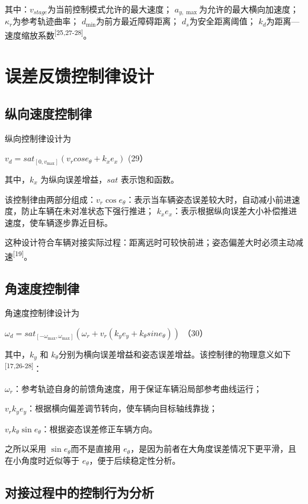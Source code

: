 其中：\(v_{stage}\)为当前控制模式允许的最大速度；
\(a_{y,\max}\)为允许的最大横向加速度； \(\kappa_{r}\)为参考轨迹曲率；
\(d_{\min}\)为前方最近障碍距离； \(d_{s}\)为安全距离阈值；
\(k_{d}\)为距离---速度缩放系数\textsuperscript{[25,27-28]}。

\section{误差反馈控制律设计}

\subsection{纵向速度控制律}

纵向控制律设计为

\(v_{d} = {sat}_{\left\lbrack 0,v_{\max} \right\rbrack}\left( v_{r}cose_{\theta} + k_{x}e_{x} \right)\)
(29）

其中，\(k_{x}\) 为纵向误差增益，\(sat\) 表示饱和函数。

该控制律由两部分组成：\(v_{r}\cos e_{\theta}\)：表示当车辆姿态误差较大时，自动减小前进速度，防止车辆在未对准状态下强行推进；
\(k_{x}e_{x}\)：表示根据纵向误差大小补偿推进速度，使车辆逐步靠近目标。

这种设计符合车辆对接实际过程：距离远时可较快前进；姿态偏差大时必须主动减速\textsuperscript{[19]}。

\subsection{角速度控制律}

角速度控制律设计为

\(\omega_{d} = {sat}_{\left\lbrack - \omega_{\max},\omega_{\max} \right\rbrack}\left( \omega_{r} + v_{r}(k_{y}e_{y} + k_{\theta}sine_{\theta}) \right)\)
（30）

其中，\(k_{y}\) 和
\(k_{\theta}\)分别为横向误差增益和姿态误差增益。该控制律的物理意义如下\textsuperscript{[17,26-28]}：

\(\omega_{r}\)：参考轨迹自身的前馈角速度，用于保证车辆沿局部参考曲线运行；

\(v_{r}k_{y}e_{y}\)：根据横向偏差调节转向，使车辆向目标轴线靠拢；

\(v_{r}k_{\theta}\sin e_{\theta}\)：根据姿态误差修正车辆方向。

之所以采用 \(\sin e_{\theta}\)而不是直接用
\(e_{\theta}\)，是因为前者在大角度误差情况下更平滑，且在小角度时近似等于
\(e_{\theta}\)，便于后续稳定性分析。

\subsection{对接过程中的控制行为分析}

